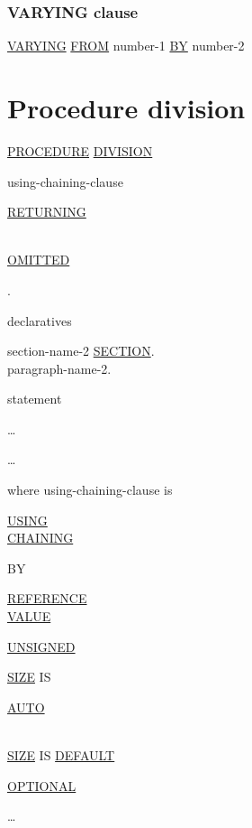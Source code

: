 \documentclass[a4paper,oneside,svgnames]{scrbook}
\makeatletter
\newcommand{\key}[1]{\underline{#1}}
\newcommand{\miscext}[1]{%
  \colorbox{blue!50}{#1}}
\newcommand{\pending}[1]{%
  \textcolor{gray!75}{#1}}
\newenvironment{0-1}{$\left[ \begin{tabular}{@{}l@{}}}{\end{tabular} \right]$}
\newenvironment{1=}{$\left\{ \begin{tabular}{@{}l@{}}}{\end{tabular} \right\}$}
\makeatother
\begin{document}
\subsection{VARYING clause}
\key{VARYING} \identifier \key{FROM} number-1 \key{BY} number-2

\chapter{Procedure division}

\key{PROCEDURE} \key{DIVISION}
\begin{0-1}
using-chaining-clause
\end{0-1}
\begin{0-1}
  \key{RETURNING}
  \begin{1=}
    \identifier \\
    \key{OMITTED}
  \end{1=}
\end{0-1}.\newline
\begin{0-1}
  declaratives
\end{0-1}\newline
\begin{0-1}
  section-name-2 \key{SECTION}. \\
  paragraph-name-2. \\
  \begin{1=}
    statement
  \end{1=}\ldots
\end{0-1} \ldots

where using-chaining-clause is

\begin{1=}
  \key{USING} \\
  \miscext{\key{CHAINING}}
\end{1=}
\begin{1=}
  BY
  \begin{1=}
    \key{REFERENCE} \\
    \pending{\key{VALUE}}
  \end{1=}
  \miscext{
    \begin{0-1}
      \begin{0-1}
        \key{UNSIGNED}
      \end{0-1}
      \key{SIZE} IS
      \begin{1=}
        \key{AUTO} \\
        \integer
      \end{1=} \\

      \key{SIZE} IS \key{DEFAULT}
    \end{0-1}
  }

  \begin{0-1}
    \key{OPTIONAL}
  \end{0-1}
  \identifier
\end{1=}\ldots
\end{document}
